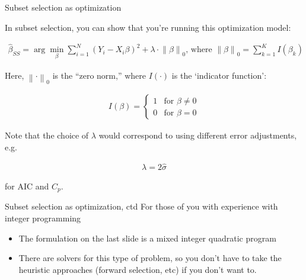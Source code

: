 \documentclass[mathserif, aspectratio=169]{beamer}
\newcommand{\norm}[1]{\left\lVert #1 \right\rVert}
\begin{document}
\begin{frame}{Subset selection as optimization}

In subset selection, you can show that you're running this optimization model:

\begin{align*}
\hat{\beta}_{SS} = \arg \min_\beta \sum_{i=1}^N \left(Y_i - X_i \beta \right)^2+\lambda \cdot \norm{\beta}_0\text{, where }\norm{\beta}_0=\sum_{k=1}^K I(\beta_k)
\end{align*}

Here, $\norm{\cdot}_0$ is the ``zero norm,'' where $I(\cdot)$ is the `indicator function':

\begin{align*}
I(\beta)=
\begin{cases}
  1 & \text{for }\beta \ne 0\\    
  0 & \text{for }\beta = 0    
\end{cases}
\end{align*}

Note that the choice of $\lambda$ would correspond to using different error adjustments, e.g. 

\begin{align*}
\lambda = 2\hat{\sigma}
\end{align*}

for AIC and $C_p$.
\end{frame}

\begin{frame}{Subset selection as optimization, ctd}
For those of you with experience with integer programming
\begin{itemize}
\item The formulation on the last slide is a mixed integer quadratic program
\item There are solvers for this type of problem, so you don't have to take the heuristic approaches (forward selection, etc) if you don't want to.
\end{itemize}
\end{frame}
\end{document}
